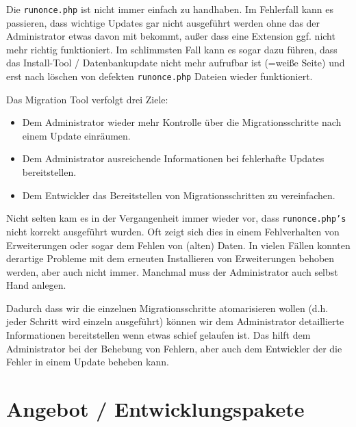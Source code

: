 \documentclass[
paper=a4,
draft=false,%
fontsize=10pt%
]{scrartcl}
\begin{document}
Die \texttt{runonce.php} ist nicht immer einfach zu handhaben. Im Fehlerfall kann es passieren, dass wichtige Updates gar nicht ausgeführt werden ohne das der Administrator etwas davon mit bekommt, außer dass eine Extension ggf. nicht mehr richtig funktioniert. Im schlimmsten Fall kann es sogar dazu führen, dass das Install-Tool / Datenbankupdate nicht mehr aufrufbar ist (=weiße Seite) und erst nach löschen von defekten \texttt{runonce.php} Dateien wieder funktioniert.

Das Migration Tool verfolgt drei Ziele:

\begin{itemize}
\item Dem Administrator wieder mehr Kontrolle über die Migrationsschritte nach einem Update einräumen.
\item Dem Administrator ausreichende Informationen bei fehlerhafte Updates bereitstellen.
\item Dem Entwickler das Bereitstellen von Migrationsschritten zu vereinfachen.
\end{itemize}

Nicht selten kam es in der Vergangenheit immer wieder vor, dass \texttt{runonce.php's} nicht korrekt ausgeführt wurden. Oft zeigt sich dies in einem Fehlverhalten von Erweiterungen oder sogar dem Fehlen von (alten) Daten. In vielen Fällen konnten derartige Probleme mit dem erneuten Installieren von Erweiterungen behoben werden, aber auch nicht immer. Manchmal muss der Administrator auch selbst Hand anlegen.

Dadurch dass wir die einzelnen Migrationsschritte atomarisieren wollen (d.h. jeder Schritt wird einzeln ausgeführt) können wir dem Administrator detaillierte Informationen bereitstellen wenn etwas schief gelaufen ist. Das hilft dem Administrator bei der Behebung von Fehlern, aber auch dem Entwickler der die Fehler in einem Update beheben kann.

%
%

\newpage

\section{Angebot / Entwicklungspakete}

%
%
\end{document}
